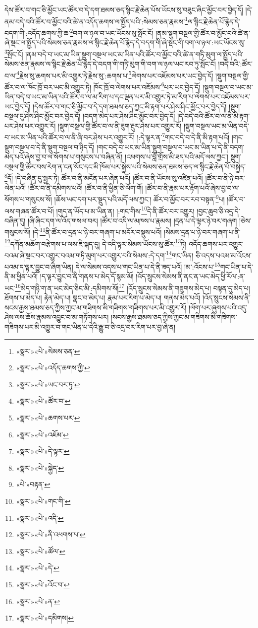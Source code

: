 དེས་ཚོར་བ་གང་ཅི་མྱོང་ཡང་ཚོར་བ་དེ་དག་ཐམས་ཅད་སྙིང་རྗེ་ཆེན་པོས་ཡོངས་སུ་བཟུང་ཞིང་མྱོང་བར་བྱེད་དོ། །དེ་ནམ་བདེ་བའི་ཚོར་བ་མྱོང་བའི་ཚེ་ན་འདོད་ཆགས་ལ་སྤྱོད་པའི་:སེམས་ཅན་རྣམས་\footnote{«སྣར་»«པེ་»སེམས་ཅན་}ལ་སྙིང་རྗེ་ཆེན་པོ་རྙེད་དེ་བདག་གི་:འདོད་ཆགས་ཀྱི་ཆ་\footnote{«སྣར་»«པེ་»འདོད་ཆགས་ཀྱི་}བག་ལ་ཉལ་བ་ཡང་ཡོངས་སུ་སྤོང་ངོ། །ནམ་སྡུག་བསྔལ་གྱི་ཚོར་བ་མྱོང་བའི་ཚེ་ན་ཞེ་སྡང་ལ་སྤྱོད་པའི་སེམས་ཅན་རྣམས་ལ་སྙིང་རྗེ་ཆེན་པོ་རྙེད་དེ་བདག་གི་ཞེ་སྡང་གི་བག་ལ་ཉལ་:ཡང་ཡོངས་སུ་\footnote{«སྣར་»«པེ་»ཡང་བར་ཏུ་}སྤོང་ངོ། །ནམ་བདེ་བ་ཡང་མ་ཡིན་སྡུག་བསྔལ་ཡང་མ་ཡིན་པའི་ཚོར་བ་མྱོང་བའི་ཚེ་ན་གཏི་མུག་ལ་སྤྱོད་པའི་སེམས་ཅན་རྣམས་ལ་སྙིང་རྗེ་ཆེན་པོ་རྙེད་དེ་བདག་གི་གཏི་མུག་གི་བག་ལ་ཉལ་ཡང་རབ་ཏུ་སྤོང་ངོ། །བདེ་བའི་:ཚོར་བ་ལ་\footnote{«སྣར་»«པེ་»ཚོར་བ་}རྗེས་སུ་ཆགས་པར་མི་འགྱུར་ཏེ་རྗེས་སུ་:ཆགས་པ་\footnote{«སྣར་»«པེ་»ཆགས་པར་}ལེགས་པར་འཇོམས་པར་ཡང་བྱེད་དོ། །སྡུག་བསྔལ་གྱི་ཚོར་བ་ལ་ཁོང་ཁྲོ་བར་ཡང་མི་འགྱུར་ཏེ། ཁོང་ཁྲོ་བ་ལེགས་པར་འཇོམས་\footnote{«སྣར་»«པེ་»འཇོམ་}པར་ཡང་བྱེད་དོ། །སྡུག་བསྔལ་བ་ཡང་མ་ཡིན་བདེ་བ་ཡང་མ་ཡིན་པའི་ཚོར་བ་ལ་མ་རིག་པ་དང་ལྡན་པར་མི་འགྱུར་ཏེ་མ་རིག་པ་ལེགས་པར་འཇོམས་པར་ཡང་བྱེད་དོ། །དེས་ཚོར་བ་གང་ཅི་མྱོང་བ་དེ་དག་ཐམས་ཅད་ཀྱང་མི་རྟག་པར་ཤེས་ཤིང་མྱོང་བར་བྱེད་དོ། །སྡུག་བསྔལ་དུ་ཤེས་ཤིང་མྱོང་བར་བྱེད་དོ། །བདག་མེད་པར་ཤེས་ཤིང་མྱོང་བར་བྱེད་དོ། །དེ་བདེ་བའི་ཚོར་བ་ལ་ནི་མི་རྟག་པར་ཤེས་པར་འགྱུར་རོ། །སྡུག་བསྔལ་གྱི་ཚོར་བ་ལ་ནི་ཟུག་རྔུར་ཤེས་པར་འགྱུར་རོ། །སྡུག་བསྔལ་ཡང་མ་ཡིན་བདེ་བ་ཡང་མ་ཡིན་པའི་ཚོར་བ་ལ་ནི་ཞི་བར་ཤེས་པར་འགྱུར་རོ། །:དེ་ལྟར་ན་\footnote{«སྣར་»«པེ་»དེ་ལྟར་}གང་བདེ་བ་དེ་ནི་མི་རྟག་པའོ། །གང་སྡུག་བསྔལ་བ་དེ་ནི་སྡུག་བསྔལ་བ་ཉིད་དོ། །གང་བདེ་བ་ཡང་མ་ཡིན་སྡུག་བསྔལ་བ་ཡང་མ་ཡིན་པ་དེ་ནི་བདག་མེད་པའོ་ཞེས་བྱ་བ་ལ་སོགས་པ་གསུངས་པ་བཞིན་ནོ། །འཕགས་པ་བློ་གྲོས་མི་ཟད་པའི་མདོ་ལས་ཀྱང་། སྡུག་བསྔལ་གྱི་ཚོར་བས་རེག་ན་ངན་སོང་དང་མི་ཁོམ་པར་སྐྱེས་པའི་སེམས་ཅན་ཐམས་ཅད་ལ་སྙིང་རྗེ་ཆེན་པོ་བསྐྱེད་\footnote{«སྣར་»«པེ་»སྐྱེད་}དོ། །དེ་བཞིན་དུ་སྦྱར་ཏེ། ཚོར་བ་ནི་མངོན་པར་ཞེན་པའོ། །ཚོར་བ་ནི་ཡོངས་སུ་འཛིན་པའོ། །ཚོར་བ་ནི་ཉེ་བར་ལེན་པའོ། །ཚོར་བ་ནི་དམིགས་པའོ། །ཚོར་བ་ནི་ཕྱིན་ཅི་ལོག་གོ། །ཚོར་བ་ནི་རྣམ་པར་རྟོག་པའོ་ཞེས་བྱ་བ་ལ་སོགས་པ་གསུངས་སོ། །ཆོས་ཡང་དག་པར་སྡུད་པའི་མདོ་ལས་ཀྱང་། ཚོར་བ་མྱོང་བར་རབ་བསྟན་\footnote{«པེ་»བརྟན་}པ། །ཚོར་བ་ལས་གཞན་ཚོར་བ་པོ། །གུད་ན་ཡོད་པ་མ་ཡིན་ན། །:གང་གིས་\footnote{«སྣར་»«པེ་»གང་གི་}དེ་ནི་ཚོར་བར་འགྱུར། །བྱང་ཆུབ་ཅི་འདྲ་དེ་བཞིན་དུ། །ཞི་ཞིང་དག་ལ་འོད་གསལ་བར། །ཚོར་བ་འདི་ལ་མཁས་པ་རྣམས། །དྲན་པ་དེ་ལྟར་ཉེ་བར་གཞག །ཅེས་གསུངས་སོ། །དེ་\footnote{«སྣར་»«པེ་»འདི་}ནི་ཚོར་བ་དྲན་པ་ཉེ་བར་གཞག་པ་མདོར་བསྡུས་པའོ། །སེམས་དྲན་པ་ཉེ་བར་གཞག་པ་ནི་\footnote{«སྣར་»«པེ་»ནི་འཕགས་པ་}དཀོན་མཆོག་བརྩེགས་པ་ལས་ཇི་སྐད་དུ། དེ་འདི་ལྟར་སེམས་ཡོངས་སུ་ཚོར་\footnote{«སྣར་»«པེ་»ཚོལ་}ཏེ། འདོད་ཆགས་པར་འགྱུར་བའམ་ཞེ་སྡང་བར་འགྱུར་བའམ་གཏི་མུག་པར་འགྱུར་བའི་སེམས་:དེ་དག་\footnote{«སྣར་»«པེ་»དེ་}གང་ཡིན། ཅི་འདས་པའམ་མ་འོངས་པའམ་ད་ལྟར་བྱུང་བ་ཞིག་ཡིན། དེ་ལ་སེམས་འདས་པ་གང་ཡིན་པ་དེ་ནི་ཟད་པའོ། །མ་:འོངས་པ་\footnote{«སྣར་»«པེ་»འོང་བ་}གང་ཡིན་པ་དེ་ནི་མ་ཕྱིན་པའོ། །ད་ལྟར་བྱུང་བ་ནི་གནས་པ་མེད་དོ་སྙམ་མོ། །འོད་སྲུངས་སེམས་ནི་ནང་ན་ཡང་མེད་ཕྱི་རོལ་:ན་ཡང་\footnote{«སྣར་»«པེ་»ན་}མེད་གཉི་ག་ན་ཡང་མེད་ཅིང་མི་:དམིགས་སོ།\footnote{«སྣར་»«པེ་»དམིགས།} །འོད་སྲུངས་སེམས་ནི་གཟུགས་མེད་པ། བསྟན་དུ་མེད་པ། ཐོགས་པ་མེད་པ། རྟེན་མེད་པ། སྣང་བ་མེད་པ། རྣམ་པར་རིག་པ་མེད་པ། གནས་མེད་པའོ། །འོད་སྲུངས་སེམས་ནི་སངས་རྒྱས་ཐམས་ཅད་ཀྱིས་ཀྱང་མ་གཟིགས་མི་གཟིགས་གཟིགས་པར་མི་འགྱུར་རོ། །ལོག་པར་ཞུགས་པའི་འདུ་ཤེས་ལས་ཆོས་རྣམས་འབྱུང་བ་མ་གཏོགས་པར། །སངས་རྒྱས་ཐམས་ཅད་ཀྱིས་ཀྱང་མ་གཟིགས་མི་གཟིགས་གཟིགས་པར་མི་འགྱུར་བ་གང་ཡིན་པ་དེའི་རྒྱུ་བ་ཅི་འདྲ་བར་རིག་པར་བྱ་ཞེ་ན། 